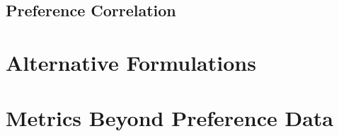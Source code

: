 \documentclass{article}
\begin{document}
\subsection{Preference Correlation}



\section{Alternative Formulations}



\section{Metrics Beyond Preference Data}
\label{Beyond}







\end{document}
